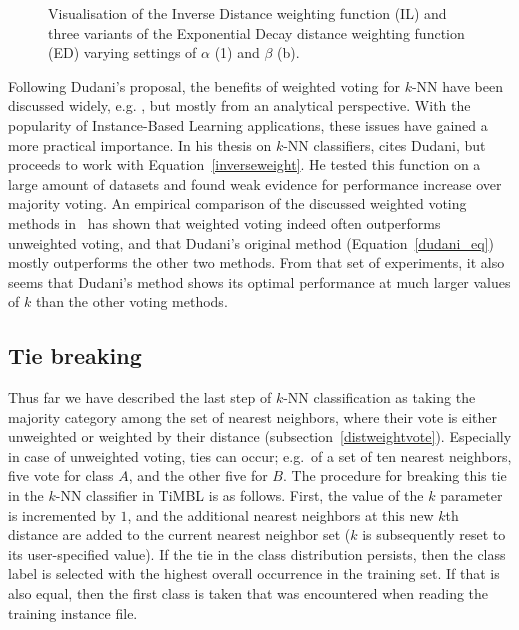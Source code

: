 \documentclass{book}
\begin{document}
\begin{figure}[htb]
        \begin{center}
                \leavevmode
                \columnwidth
                \caption{Visualisation of the Inverse Distance
                  weighting function (IL) and three variants of the
                  Exponential Decay distance weighting function (ED)
                  varying settings of $\alpha$ (1) and $\beta$ (b).  }
                \label{dist-weight-fig}
        \end{center}
\end{figure}

Following Dudani's proposal, the benefits of weighted voting for
$k$-NN have been discussed widely,
e.g. \cite{Bailey+78,Morin+81,MacLeod+87}, but mostly from an
analytical perspective. With the popularity of Instance-Based Learning
applications, these issues have gained a more practical importance. In
his thesis on $k$-NN classifiers,  cites
Dudani, but proceeds to work with Equation~\ref{inverseweight}. He
tested this function on a large amount of datasets and found weak
evidence for performance increase over majority voting. An empirical
comparison of the discussed weighted voting methods in~\cite{Zavrel97}
has shown that weighted voting indeed often outperforms unweighted
voting, and that Dudani's original method (Equation~\ref{dudani_eq})
mostly outperforms the other two methods. From that set of
experiments, it also seems that Dudani's method shows its optimal
performance at much larger values of $k$ than the other voting
methods.

\subsection{Tie breaking}
\label{tiebreaking}

Thus far we have described the last step of $k$-NN classification as
taking the majority category among the set of nearest neighbors, where
their vote is either unweighted or weighted by their distance
(subsection~\ref{distweightvote}). Especially in case of unweighted
voting, ties can occur; e.g.\ of a set of ten nearest neighbors, five
vote for class $A$, and the other five for $B$. The procedure for
breaking this tie in the $k$-NN classifier in TiMBL is as
follows. First, the value of the $k$ parameter is incremented by $1$,
and the additional nearest neighbors at this new $k$th distance are
added to the current nearest neighbor set ($k$ is subsequently reset
to its user-specified value). If the tie in the class distribution
persists, then the class label is selected with the highest overall
occurrence in the training set. If that is also equal, then the first
class is taken that was encountered when reading the training instance
file.
\end{document}
